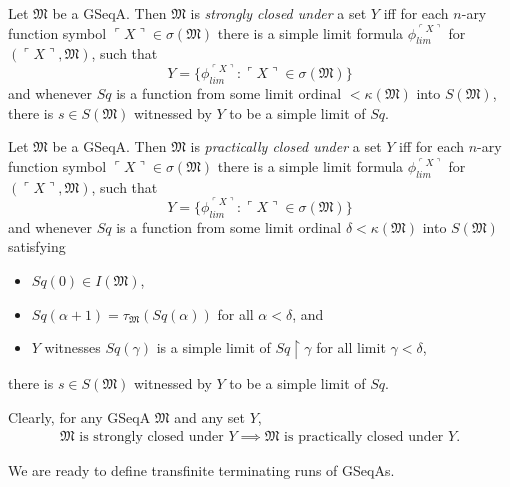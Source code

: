 \documentclass[12pt]{article}
\numberwithin{equation}{section}
\begin{document}
\begin{defi}\label{def237}
Let $\mathfrak{M}$ be a GSeqA. Then $\mathfrak{M}$ is \emph{strongly closed under} a set $Y$ iff for each $n$-ary function symbol $\ulcorner X \urcorner \in \sigma(\mathfrak{M})$ there is a simple limit formula $\phi_{lim}^{\ulcorner X \urcorner}$ for $(\ulcorner X \urcorner, \mathfrak{M})$, such that 
\begin{equation*}
    Y = \{\phi_{lim}^{\ulcorner X \urcorner} : \ulcorner X \urcorner \in \sigma(\mathfrak{M})\}
\end{equation*}
and whenever $Sq$ is a function from some limit ordinal $< \kappa(\mathfrak{M})$ into $S(\mathfrak{M})$, there is $s \in S(\mathfrak{M})$ witnessed by $Y$ to be a simple limit of $Sq$.
\end{defi}

\begin{defi}\label{def238}
Let $\mathfrak{M}$ be a GSeqA. Then $\mathfrak{M}$ is \emph{practically closed under} a set $Y$ iff for each $n$-ary function symbol $\ulcorner X \urcorner \in \sigma(\mathfrak{M})$ there is a simple limit formula $\phi_{lim}^{\ulcorner X \urcorner}$ for $(\ulcorner X \urcorner, \mathfrak{M})$, such that 
\begin{equation*}
    Y = \{\phi_{lim}^{\ulcorner X \urcorner} : \ulcorner X \urcorner \in \sigma(\mathfrak{M})\}
\end{equation*}
and whenever $Sq$ is a function from some limit ordinal $\delta < \kappa(\mathfrak{M})$ into $S(\mathfrak{M})$ satisfying
\begin{itemize}
    \item $Sq(0) \in I(\mathfrak{M})$,
    \item $Sq(\alpha + 1) = \tau_{\mathfrak{M}}(Sq(\alpha))$ for all $\alpha < \delta$, and
    \item $Y$ witnesses $Sq(\gamma)$ is a simple limit of $Sq \restriction \gamma$ for all limit $\gamma < \delta$,
\end{itemize}
there is $s \in S(\mathfrak{M})$ witnessed by $Y$ to be a simple limit of $Sq$.
\end{defi}

Clearly, for any GSeqA $\mathfrak{M}$ and any set $Y$,
\begin{align*}
    \mathfrak{M} \text{ is strongly closed under } Y \implies \mathfrak{M} \text{ is practically closed under } Y \text{.}
\end{align*}

We are ready to define transfinite terminating runs of GSeqAs.
\end{document}
